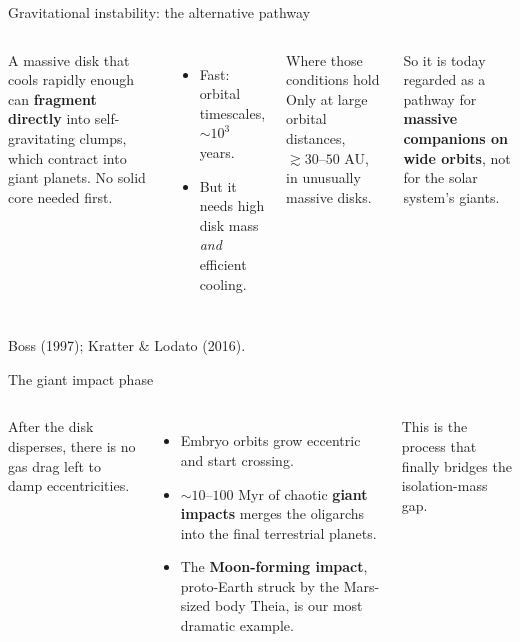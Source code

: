 \documentclass[aspectratio=169, 11pt]{beamer}
\begin{document}
\begin{frame}{Gravitational instability: the alternative pathway}
  \begin{columns}[T]
    A massive disk that cools rapidly enough can \textbf{fragment directly} into self-gravitating clumps, which contract into giant planets. No solid core needed first.
    \vskip6pt\relax
    \begin{itemize}
      \item Fast: orbital timescales, $\sim 10^3$ years.
      \item But it needs high disk mass \emph{and} efficient cooling.
    \end{itemize}

    \begin{block}{Where those conditions hold}
      Only at large orbital distances, $\gtrsim 30$--$50$ AU, in unusually massive disks.
    \end{block}
    \vskip8pt\relax
    So it is today regarded as a pathway for \textbf{massive companions on wide orbits}, not for the solar system's giants.
  \end{columns}
  \vskip6pt\relax
  {\footnotesize Boss (1997); Kratter \& Lodato (2016).}
\end{frame}

\begin{frame}{The giant impact phase}
  \begin{columns}[c]
    \column{\recapfigcolnarrow}
    \centering

    \column{\recaptextcolwide}
    After the disk disperses, there is no gas drag left to damp eccentricities.
    \begin{itemize}
      \item Embryo orbits grow eccentric and start crossing.
      \item $\sim 10$--$100$ Myr of chaotic \textbf{giant impacts} merges the oligarchs into the final terrestrial planets.
      \item The \textbf{Moon-forming impact}, proto-Earth struck by the Mars-sized body Theia, is our most dramatic example.
    \end{itemize}
    \vskip4pt\relax
    This is the process that finally bridges the isolation-mass gap.
  \end{columns}
\end{frame}
\end{document}
